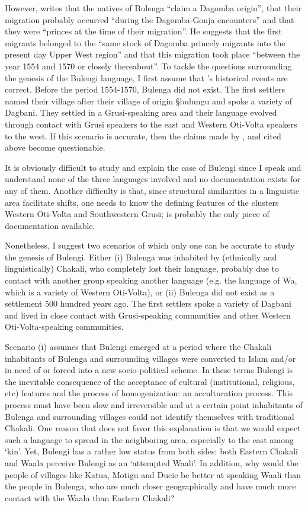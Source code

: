 However,    \citeauthor{Sali08}  writes that the natives of
Bulenga ``claim a Dagomba origin'', that their migration probably occurred
``during the Dagomba-Gonja encounters'' and that they were ``princes at the time
of their migration''. He suggests that the first migrants belonged to the ``same
stock of Dagomba princely migrants into the present day Upper West region'' and
that this migration took place ``between the year 1554 and 1570 or closely
thereabout''. To tackle the questions surrounding the genesis of the 
Bulengi language, I  first assume that \citeauthor{Sali08}'s 
historical events
are correct. Before the period 1554-1570, Bulenga did not exist. The first
settlers
named their village after their village of origin {\S bulungu} \citep[36-37,
65]{Sali08} and spoke a variety of Dagbani. They settled in a Grusi-speaking
area and their language evolved through contact with Grusi speakers to the east
and Western Oti-Volta speakers to the west. If this scenario is accurate, 
then the  claims made by \cite{Wilk89},   \cite{Daan94} and \cite{Sali08} cited
above become questionable. 

It is obviously  difficult to study and explain the case of Bulengi  since
I speak  and understand none  of the three languages involved and no
documentation exists for
any of them.  Another difficulty is that, since structural similarities in a
linguistic area facilitate shifts, one needs to know the defining features of
the clusters Western Oti-Volta and Southwestern Grusi; \cite{Nade89} is probably
the only  piece of documentation available. 


Nonetheless, I suggest two scenarios of which only one can be accurate  to study
the genesis of Bulengi. Either (i) Bulenga was inhabited by
(ethnically and linguistically) Chakali, who completely lost their
language, probably due to contact with another group speaking another language
(e.g. the language of Wa,  which is  a variety of  Western Oti-Volta), or
(ii) Bulenga did not exist as a settlement 500 hundred years ago. The first
settlers spoke a variety of Dagbani and lived in close contact with
Grusi-speaking communities and other  Western Oti-Volta-speaking communities.


Scenario (i)  assumes that  Bulengi  emerged at a period where the
Chakali
inhabitants of Bulenga and surrounding villages were converted to Islam and/or
in
need of or forced into a new socio-political scheme.  In these terms Bulengi is
the inevitable consequence of the acceptance of cultural (institutional,
religious, etc) features and the process of homogenization:  an acculturation
process. This process must have been slow and irreversible and at a certain
point
inhabitants of Bulenga and surrounding villages could not identify themselves
with
traditional Chakali. One reason that does not favor this explanation is that
we
would expect such a language to  spread in the neighboring area, especially to
the east among  `kin'. Yet, Bulengi has a rather low status
from both sides: both Eastern Chakali and Waala perceive Bulengi as an
`attempted Waali'. In addition, why would the people of  villages like Katua,
Motigu and Ducie be better at speaking Waali than the people in Bulenga, who are
much closer geographically and have much more contact with the Waala than
Eastern Chakali? 

